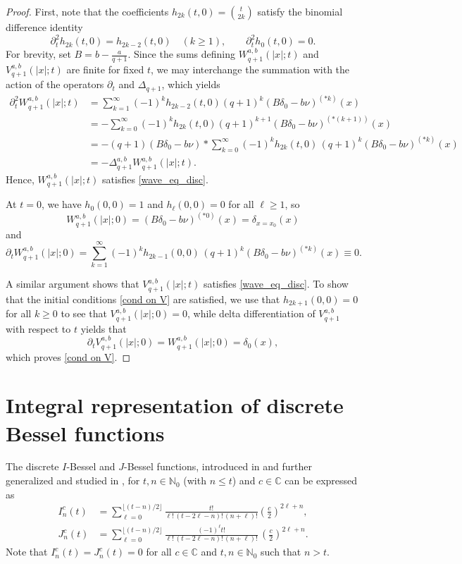 \documentclass[12pt]{amsart}
\numberwithin{equation}{section}
\theoremstyle{boldremark}
\begin{document}
\begin{proof}
First, note that the coefficients $h_{2k}(t,0)=\binom{t}{2k}$ satisfy the binomial difference identity
$$
\partial_t^2 h_{2k}(t,0)=h_{2k-2}(t,0)\quad(k\ge1), \qquad \partial_t^2 h_0(t,0)=0.
$$
For brevity, set $B=b-\frac{a}{q+1}$. Since the sums defining $W_{q+1}^{a,b}(|x|;t)$ and $V_{q+1}^{a,b}(|x|;t)$ are finite for fixed $t$, we may interchange the summation with the action of the operators $\partial_t$ and $\Delta_{q+1}$, which yields 
\begin{equation*}
\begin{split}
\partial_t^2 W_{q+1}^{a,b}(|x|;t)
&= \sum_{k=1}^{\infty}(-1)^k h_{2k-2}(t,0)(q+1)^k \left(B\delta_0 -b\nu \right)^{(*k)}(x)\\
&=-\sum_{k=0}^{\infty}(-1)^k h_{2k}(t,0)(q+1)^{k+1} \left( B \delta_0 -b\nu \right)^{(\ast(k+1))}(x)\\
&=
-(q+1)\left(B \delta_0 -b\nu \right)\ast \sum_{k=0}^{\infty} (-1)^k h_{2k}(t,0)\,(q+1)^k \left(B\delta_0 -b\nu \right)^{(*k)}(x) \label{eq. wave eq. prop}\\
&=
-\Delta_{q+1}^{a,b}W_{q+1}^{a,b}(|x|;t).
\end{split}
\end{equation*}
Hence, $W_{q+1}^{a,b}(|x|;t)$ satisfies \eqref{wave_eq_disc}.

\medskip
At $t=0$, we have $h_0(0,0)=1$ and $h_{\ell}(0,0)=0$ for all $\ell\ge1$, so
$$
W_{q+1}^{a,b}(|x|;0)=\left( B\delta_0 - b\nu \right)^{(*0)}(x)= \delta_{x=x_0}(x)
$$
and
$$
\partial_t W_{q+1}^{a,b}(|x|;0)=\sum_{k=1}^{\infty} (-1)^k h_{2k-1}(0,0)\,(q+1)^k \left( B\delta_0 - b\nu \right)^{(*k)}(x)\equiv 0.
$$

A similar argument shows that $V_{q+1}^{a,b}(|x|;t)$ satisfies \eqref{wave_eq_disc}. To show that the initial conditions \eqref{cond on V} are satisfied, we use that $h_{2k+1}(0,0)=0$ for all $k\geq 0$ to see that $V_{q+1}^{a,b}(|x|;0)=0$, while delta differentiation of $V_{q+1}^{a,b}$ with respect to $t$ yields that
$$
\partial_t V_{q+1}^{a,b}(|x|;0)=W_{q+1}^{a,b}(|x|;0)=\delta_0(x),
$$
which proves \eqref{cond on V}.
\end{proof}

\section{Integral representation of discrete Bessel functions}\label{sec:int-repr}

The discrete $I$-Bessel and $J$-Bessel functions, introduced in \cite{Cu15} and further generalized and studied in \cite{BC, Slav18, KS22, CHJSV, BSS24}, for $t,n\in\mathbb{N}_0$ (with $n\le t$) and $c\in\mathbb{C}$ can be expressed as 
\begin{align}
I^{c}_{n}(t)
&= \sum_{\ell=0}^{\lfloor (t-n)/2\rfloor}
\frac{t!}{\ell!\,(t-2\ell-n)!\,(n+\ell)!}\left(\frac{c}{2}\right)^{2\ell+n},\label{eq:def-I-Bessel}\\
J^{c}_{n}(t)
&= \sum_{\ell=0}^{\lfloor (t-n)/2\rfloor}
\frac{(-1)^{\ell}t!}{\ell!\,(t-2\ell-n)!\,(n+\ell)!}\,\left(\frac{c}{2}\right)^{2\ell+n}.\label{eq:def-J-Bessel}
\end{align}
Note that $I^{c}_{n}(t)= J^{c}_{n}(t)=0$ for all $c\in\mathbb{C}$ and $t,n\in\mathbb{N}_0$ such that $n> t$. 
\end{document}
